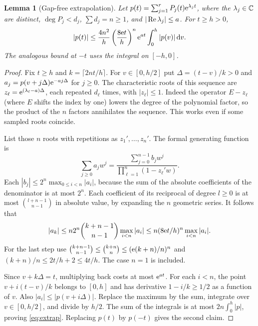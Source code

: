 \documentclass[11pt]{article}
\newtheorem{lemma}[theorem]{Lemma}
\theoremstyle{remark}\newtheorem{remark}[theorem]{Remark}
\begin{document}
\begin{lemma}[Gap-free extrapolation]\label{lem:extrap}
Let $p(t)=\sum_{j=1}^r P_j(t)\mathrm e^{\lambda_jt}$, where the $\lambda_j\in\mathbb C$ are distinct, $\deg P_j<d_j$, $\sum d_j=n\ge1$, and $|\operatorname{Re}\lambda_j|\le a$. For $t\ge h>0$,
\begin{equation}\label{eq:extrap}
|p(t)|\le\frac{4n^2}{h}\left(\frac{8\mathrm e t}{h}\right)^n\mathrm e^{at}\int_0^h|p(v)|\,\mathrm d v.
\end{equation}
The analogous bound at $-t$ uses the integral on $[-h,0]$.
\end{lemma}
\begin{proof}
Fix $t\ge h$ and $k=\lceil 2nt/h\rceil$. For $v\in[0,h/2]$ put $\Delta=(t-v)/k>0$ and $a_j=p(v+j\Delta)\mathrm e^{-a j\Delta}$ for $j\ge0$. The characteristic roots of this sequence are $z_\ell=\mathrm e^{(\lambda_\ell-a)\Delta}$, each repeated $d_\ell$ times, with $|z_\ell|\le1$. Indeed the operator $E-z_\ell$ (where $E$ shifts the index by one) lowers the degree of the polynomial factor, so the product of the $n$ factors annihilates the sequence. This works even if some sampled roots coincide.

List those $n$ roots with repetitions as $z_1',\dots,z_n'$. The formal generating function is
\[
\sum_{j\ge0}a_jw^j=\frac{\sum_{j=0}^{n-1}b_jw^j}{\prod_{\ell=1}^n(1-z_\ell'w)}.
\]
Each $|b_j|\le 2^n\max_{0\le i<n}|a_i|$, because the sum of the absolute coefficients of the denominator is at most $2^n$. Each coefficient of its reciprocal of degree $l\ge0$ is at most $\binom{l+n-1}{n-1}$ in absolute value, by expanding the $n$ geometric series. It follows that
\[
|a_k|\le n2^n\binom{k+n-1}{n-1}\max_{i<n}|a_i|
\le n(8\mathrm e t/h)^n\max_{i<n}|a_i|.
\]
For the last step use $\binom{k+n-1}{n-1}\le\binom{k+n}{n}\le(\mathrm e(k+n)/n)^n$ and $(k+n)/n\le 2t/h+2\le4t/h$. The case $n=1$ is included.

Since $v+k\Delta=t$, multiplying back costs at most $\mathrm e^{at}$. For each $i<n$, the point $v+i(t-v)/k$ belongs to $[0,h]$ and has derivative $1-i/k\ge1/2$ as a function of $v$. Also $|a_i|\le|p(v+i\Delta)|$. Replace the maximum by the sum, integrate over $v\in[0,h/2]$, and divide by $h/2$. The sum of the integrals is at most $2n\int_0^h|p|$, proving \eqref{eq:extrap}. Replacing $p(t)$ by $p(-t)$ gives the second claim.
\end{proof}
\end{document}
